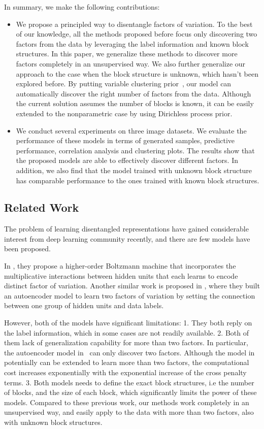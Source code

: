 In summary, we make the following contributions: 
\begin{itemize}
\item We propose a principled way to disentangle factors of variation. To the best of our knowledge, all the methods proposed before focus only discovering two factors from the data by leveraging the label information and known block structures. In this paper, we generalize these methods to discover more factors completely in an unsupervised way. We also further generalize our approach to the case when the block structure is unknown, which hasn't been explored before. By putting variable clustering prior~\cite{palla2012nonparametric}, our model can automatically discover the right number of factors from the data. Although the current solution assumes the number of blocks is known, it can be easily extended to the nonparametric case by using Dirichless process prior.
\item We conduct several experiments on three image datasets. We evaluate the performance of these models in terms of generated samples, predictive performance, correlation analysis and clustering plots. The results show that the proposed models are able to effectively discover different factors. In addition, we also find that the model trained with unknown block structure has comparable performance to the ones trained with known block structures.
\end{itemize}


\subsection{Related Work}
The problem of learning disentangled representations have gained considerable interest from deep learning community recently, and there are few models have been proposed. 

In \cite{reed2014learning}, they propose a higher-order Boltzmann machine that incorporates the multiplicative interactions between hidden units that each learns to encode distinct factor of variation. Another similar work is proposed in \cite{cheung2014discovering}, where they built an autoencoder model to learn two factors of variation by setting the connection between one group of hidden units and data labels. 

However, both of the models have significant limitations: 1. They both reply on the label information, which in some cases are not readily available. 2. Both of them lack of generalization capability for more than two factors. In particular, the autoencoder model in~\cite{cheung2014discovering} can only discover two factors. Although the model in \cite{reed2014learning} potentially can be extended to learn more than two factors, the computational cost increases exponentially with the exponential increase of the cross penalty terms. 3. Both models needs to define the exact block structures, i.e the number of blocks, and the size of each block, which significantly limits the power of these models. Compared to these previous work, our methods work completely in an unsupervised way, and easily apply to the data with more than two factors, also with unknown block structures.

